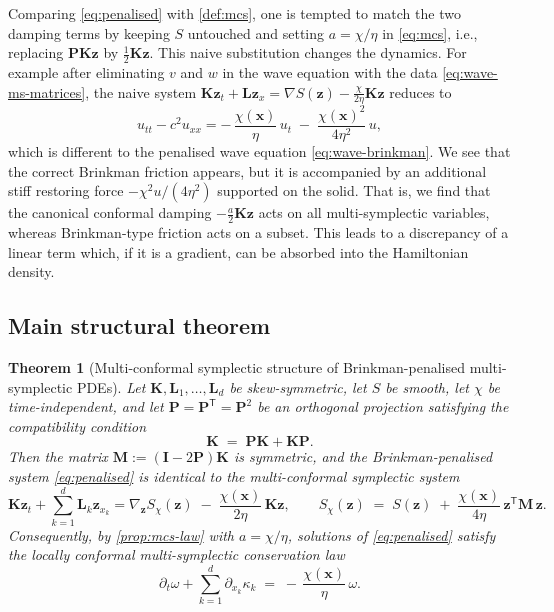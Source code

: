 \documentclass[11pt]{article}
\newtheorem{theorem}{Theorem}[section]
\theoremstyle{definition}
\theoremstyle{remark}
\newcommand{\bz}{\bm{z}}
\newcommand{\bx}{\bm{x}}
\newcommand{\bK}{\bm{K}}
\newcommand{\bL}{\bm{L}}
\newcommand{\bP}{\bm{P}}
\newcommand{\bM}{\bm{M}}
\newcommand{\bI}{\bm{I}}
\newcommand{\chixx}{\chi(\bx)}
\begin{document}
Comparing \eqref{eq:penalised} with \cref{def:mcs}, one is tempted to
match the two damping terms by keeping $S$ untouched and setting
$a=\chi/\eta$ in \eqref{eq:mcs}, i.e., replacing
$\bP\bK\bz$ by $\tfrac12\bK\bz$.  This naive substitution changes the
dynamics. For example after eliminating $v$ and $w$ in the wave equation with the data \eqref{eq:wave-ms-matrices}, the naive system
$\bK\bz_t+\bL\bz_x=\nabla S(\bz)-\frac{\chi}{2\eta}\bK\bz$ reduces to
\begin{equation}
\label{eq:naive-reduced}
u_{tt} - c^2 u_{xx}
= -\,\frac{\chixx}{\eta}\,u_t
\;-\;\frac{\chixx^{2}}{4\eta^{2}}\,u ,
\end{equation}
which is different to the penalised wave equation
\eqref{eq:wave-brinkman}. We see that the correct Brinkman friction appears, but it is accompanied by an additional stiff restoring force
$-\chi^2 u/(4\eta^2)$ supported on the solid. %
That is, we find that the
canonical conformal damping $-\frac{a}{2}\bK\bz$ acts on all
multi-symplectic variables, whereas Brinkman-type friction acts on a
subset. This leads to a discrepancy of a linear term which, if it is a gradient, can be absorbed into the Hamiltonian density.

\subsection{Main structural theorem}
\label{subsec:main}

\begin{theorem}[Multi-conformal symplectic structure of
Brinkman-penalised multi-symplectic PDEs]
\label{thm:general}
Let $\bK,\bL_1,\dots,\bL_d$ be skew-symmetric, let $S$ be smooth, let
$\chi$ be time-independent, and let $\bP=\bP^{\mathsf T}=\bP^2$ be an
orthogonal projection satisfying the \emph{compatibility condition}
\begin{equation}
\label{eq:compatibility}
\bK \;=\; \bP\bK + \bK\bP .
\end{equation}
Then the matrix $\bM:=(\bI-2\bP)\bK$ is symmetric, and the
Brinkman-penalised system \eqref{eq:penalised} is identical to the
multi-conformal symplectic system
\begin{equation}
\label{eq:penalised-canonical}
\bK\bz_t + \sum_{k=1}^{d}\bL_k\bz_{x_k}
= \nabla_{\bz}S_\chi(\bz) \;-\; \frac{\chixx}{2\eta}\,\bK\bz ,
\qquad
S_\chi(\bz)
\;=\;
S(\bz) \;+\; \frac{\chixx}{4\eta}\,\bz^{\mathsf T}\bM\,\bz .
\end{equation}
Consequently, by \cref{prop:mcs-law} with $a=\chi/\eta$, solutions of
\eqref{eq:penalised} satisfy the locally conformal multi-symplectic
conservation law
\begin{equation}
\label{eq:brinkman-law}
\partial_t\omega + \sum_{k=1}^{d}\partial_{x_k}\kappa_k
\;=\;
-\,\frac{\chixx}{\eta}\,\omega .
\end{equation}
\end{theorem}
\end{document}
